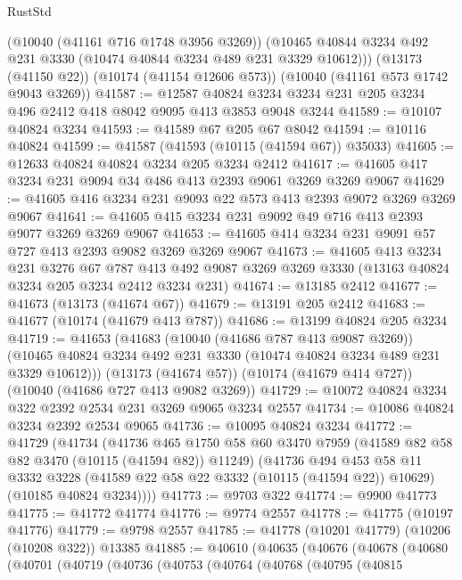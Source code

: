\begin{lexlean}{RustStd}
\begin{coremodule}
      (@10040 (@41161 @716 @1748 @3956 @3269))
      (@10465 @40844 @3234 @492 @231 @3330 (@10474 @40844 @3234 @489 @231 @3329 @10612)))
    (@13173 (@41150 @22))
    (@10174 (@41154 @12606 @573))
    (@10040 (@41161 @573 @1742 @9043 @3269))
@41587 := @12587
    @40824
    @3234
    @3234
    @231
    @205
    @3234
    @496
    @2412
    @418
    @8042
    @9095
    @413
    @3853
    @9048
    @3244
@41589 := @10107 @40824 @3234
@41593 := @41589 @67 @205 @67 @8042
@41594 := @10116 @40824
@41599 := @41587 (@41593 (@10115 (@41594 @67)) @35033)
@41605 := @12633 @40824 @40824 @3234 @205 @3234 @2412
@41617 := @41605 @417 @3234 @231 @9094 @34 @486 @413 @2393 @9061 @3269 @3269 @9067
@41629 := @41605 @416 @3234 @231 @9093 @22 @573 @413 @2393 @9072 @3269 @3269 @9067
@41641 := @41605 @415 @3234 @231 @9092 @49 @716 @413 @2393 @9077 @3269 @3269 @9067
@41653 := @41605 @414 @3234 @231 @9091 @57 @727 @413 @2393 @9082 @3269 @3269 @9067
@41673 := @41605
    @413
    @3234
    @231
    @3276
    @67
    @787
    @413
    @492
    @9087
    @3269
    @3269
    @3330
    (@13163 @40824 @3234 @205 @3234 @2412 @3234 @231)
@41674 := @13185 @2412
@41677 := @41673 (@13173 (@41674 @67))
@41679 := @13191 @205 @2412
@41683 := @41677 (@10174 (@41679 @413 @787))
@41686 := @13199 @40824 @205 @3234
@41719 := @41653
    (@41683
      (@10040 (@41686 @787 @413 @9087 @3269))
      (@10465 @40824 @3234 @492 @231 @3330 (@10474 @40824 @3234 @489 @231 @3329 @10612)))
    (@13173 (@41674 @57))
    (@10174 (@41679 @414 @727))
    (@10040 (@41686 @727 @413 @9082 @3269))
@41729 := @10072 @40824 @3234 @322 @2392 @2534 @231 @3269 @9065 @3234 @2557
@41734 := @10086 @40824 @3234 @2392 @2534 @9065
@41736 := @10095 @40824 @3234
@41772 := @41729
    (@41734
      (@41736
        @465
        @1750
        @58
        @60
        @3470
        @7959
        (@41589 @82 @58 @82 @3470 (@10115 (@41594 @82)) @11249)
        (@41736
          @494
          @453
          @58
          @11
          @3332
          @3228
          (@41589 @22 @58 @22 @3332 (@10115 (@41594 @22)) @10629)
          (@10185 @40824 @3234))))
@41773 := @9703 @322
@41774 := @9900 @41773
@41775 := @41772 @41774
@41776 := @9774 @2557
@41778 := @41775 (@10197 @41776)
@41779 := @9798 @2557
@41785 := @41778 (@10201 @41779) (@10206 (@10208 @322)) @13385
@41885 := @40610
    (@40635
      (@40676
        (@40678
          (@40680
            (@40701
              (@40719
                (@40736
                  (@40753
                    (@40764
                      (@40768
                        (@40795
                          (@40815

\end{coremodule}
\end{lexlean}
